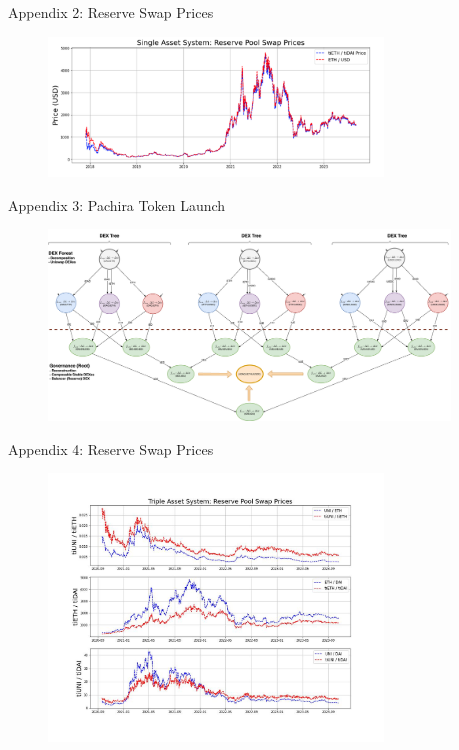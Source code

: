 \documentclass[10pt,xcolor=svgnames]{beamer} %
\begin{document}
\begin{frame}{Appendix 2: Reserve Swap Prices}
\begin{figure}[h!]
\includegraphics[width=3.5in]{img/single_swap_prices.png}
\label{fig:swap_prices}
\end{figure}
\end{frame}

\begin{frame}{Appendix 3: Pachira Token Launch}
\begin{figure}[h!]
\includegraphics[width=4.2in]{img/dex_forest.png}
\label{fig:dex_forest}
\end{figure}
\end{frame}

\begin{frame}{Appendix 4: Reserve Swap Prices}
\begin{figure}[h!]
\includegraphics[width=3.5in]{img/swap_prices.jpg}
\label{fig:swap_prices}
\end{figure}
\end{frame}
\end{document}
